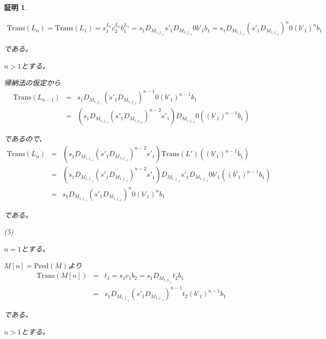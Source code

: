 \documentclass[dvipdfmx,uplatex]{jsarticle}
\theoremstyle{customnonumberbreakfortheorem}
\theoremstyle{customnonumberbreakforproof}
\newtheorem{hideableproof}{証明}
\begin{document}
\begin{hideableproof}
\begin{indented}
\begin{indented}
			\begin{eqnarray*}
			\textrm{Trans}(L_n) = \textrm{Trans}(L_1) = s_1^{L_1} c_2^{L_1} b_1^{L_1} = s_1 D_{M_{1,j_{-1}}} s'_1 D_{M_{1,j_{-2}}} 0 b'_1 b_1 = s_1 D_{M_{1,j_{-1}}} (s'_1 D_{M_{1,j_{-2}}})^n 0 (b'_1)^n b_1
			\end{eqnarray*}
			\item である。
		\end{indented}
		\item
		\item \(n > 1\)とする。
		\begin{indented}
			\item 帰納法の仮定から
			\begin{eqnarray*}
			\textrm{Trans}(L_{n-1}) & = & s_1 D_{M_{1,j_{-1}}} (s'_1 D_{M_{1,j_{-2}}})^{n-1} 0 (b'_1)^{n-1} b_1 \\
			& = & (s_1 D_{M_{1,j_{-1}}} (s'_1 D_{M_{1,j_{-2}}})^{n-2} s'_1) D_{M_{1,j_{-2}}} 0 ((b'_1)^{n-1} b_1)
			\end{eqnarray*}
			\item であるので、
			\begin{eqnarray*}
			\textrm{Trans}(L_n) & = & (s_1 D_{M_{1,j_{-1}}} (s'_1 D_{M_{1,j_{-2}}})^{n-2} s'_1) \textrm{Trans}(L') ((b'_1)^{n-1} b_1) \\
			& = & (s_1 D_{M_{1,j_{-1}}} (s'_1 D_{M_{1,j_{-2}}})^{n-2} s'_1) D_{M_{1,j_{-2}}} s'_1 D_{M_{1,j_{-2}}} 0 b'_1 ((b'_1)^{n-1} b_1) \\
			& = & s_1 D_{M_{1,j_{-1}}} (s'_1 D_{M_{1,j_{-2}}})^n 0 (b'_1)^n b_1
			\end{eqnarray*}
			\item である。
		\end{indented}
		\item
		\item (5)
		\item \(n=1\)とする。
		\begin{indented}
			\item \(M[n] = \textrm{Pred}(M)\)より
			\begin{eqnarray*}
			\textrm{Trans}(M[n]) & = & t_1 = s_1 c_1 b_2 = s_1 D_{M_{1,j_{-1}}} t_2 b_1 \\
			& = & s_1 D_{M_{1,j_{-1}}} (s'_1 D_{M_{1,j_{-2}}})^{n-1} t_2 (b'_1)^{n-1} b_1
			\end{eqnarray*}
			\item である。
		\end{indented}
		\item
		\item \(n > 1\)とする。

\end{indented}
\end{hideableproof}
\end{document}
